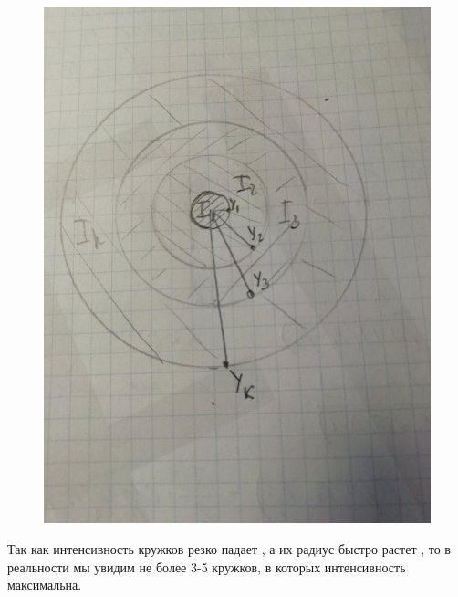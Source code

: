 \documentclass[a4paper, 12pt]{article}
\begin{document}
\begin{figure}[H]
\begin{floatrow}
        {
        \includegraphics[width=0.8\linewidth]{7}
    }
    \end{floatrow}
\end{figure}

Так как интенсивность кружков резко падает , а
их радиус быстро растет , то в реальности мы увидим не
более 3-5 кружков, в которых интенсивность максимальна. 
\end{document}
